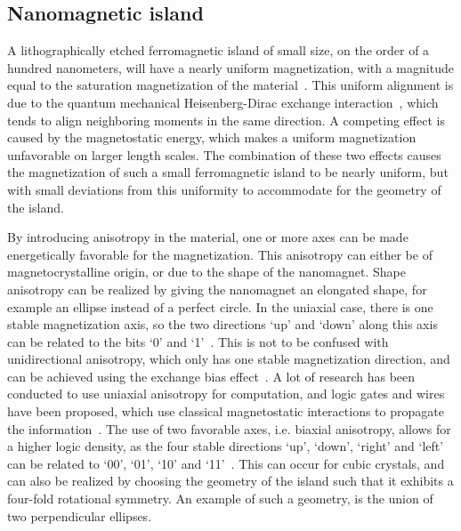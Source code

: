 \documentclass[11pt,a4paper,english]{article}
\begin{document}
\subsection{Nanomagnetic island}
A lithographically etched ferromagnetic island of small size, on the order of a hundred nanometers, will have a nearly uniform magnetization, with a magnitude equal to the saturation magnetization of the material~\cite{NML_Carlton, MQCA_RoomTemp}. This uniform alignment is due to the quantum mechanical Heisenberg-Dirac exchange interaction~\cite{MuMax3_advances, heisenberg1928theorie}, which tends to align neighboring moments in the same direction. A competing effect is caused by the magnetostatic energy, which makes a uniform magnetization unfavorable on larger length scales. The combination of these two effects causes the magnetization of such a small ferromagnetic island to be nearly uniform, but with small deviations from this uniformity to accommodate for the geometry of the island. \par
By introducing anisotropy in the material, one or more axes can be made energetically favorable for the magnetization. This anisotropy can either be of magnetocrystalline origin, or due to the shape of the nanomagnet. Shape anisotropy can be realized by giving the nanomagnet an elongated shape, for example an ellipse instead of a perfect circle. In the uniaxial case, there is one stable magnetization axis, so the two directions `up' and `down' along this axis can be related to the bits `0' and `1'~\cite{MQCA_RoomTemp}. This is not to be confused with unidirectional anisotropy, which only has one stable magnetization direction, and can be achieved using the exchange bias effect~\cite{ExchangeBias_Mechanisms,ExchangeBias_nanostructures,ExchangeBias}. A lot of research has been conducted to use uniaxial anisotropy for computation, and logic gates and wires have been proposed, which use classical magnetostatic interactions to propagate the information~\cite{GYP-18,MQCA_MajorityGate,SwitchingForced_EnergyEfficient}. The use of two favorable axes, i.e. biaxial anisotropy, allows for a higher logic density, as the four stable directions `up', `down', `right' and `left' can be related to `00', `01', `10' and `11'~\cite{MQCA_ImageRecognition}. This can occur for cubic crystals, and can also be realized by choosing the geometry of the island such that it exhibits a four-fold rotational symmetry. An example of such a geometry, is the union of two perpendicular ellipses.
\end{document}
